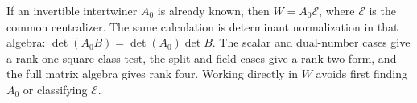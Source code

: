 If an invertible intertwiner \(A_0\) is already known, then
\(W=A_0\mathcal E\), where \(\mathcal E\) is the common centralizer.
The same calculation is determinant normalization in that algebra:
\(\det(A_0B)=\det(A_0)\det B\).  The scalar and dual-number cases give a
rank-one square-class test, the split and field cases give a rank-two form,
and the full matrix algebra gives rank four.  Working directly in \(W\)
avoids first finding \(A_0\) or classifying \(\mathcal E\).
